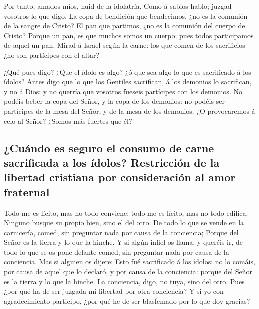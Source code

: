  Por tanto, amados míos, huid de la idolatría.
 Como á sabios hablo; juzgad vosotros lo que digo.
 La copa de bendición que bendecimos, ¿no es la comunión de
la sangre de Cristo? El pan que partimos, ¿no es la comunión del cuerpo
de Cristo?  Porque un pan, es que muchos somos un cuerpo;
pues todos participamos de aquel un pan.  Mirad á Israel
según la carne: los que comen de los sacrificios ¿no son partícipes con
el altar?

 ¿Qué pues digo? ¿Que el ídolo es algo? ¿ó que sea algo lo
que es sacrificado á los ídolos?  Antes digo que lo que los
Gentiles sacrifican, á los demonios lo sacrifican, y no á Dios: y no
querría que vosotros fueseis partícipes con los demonios. 
No podéis beber la copa del Señor, y la copa de los demonios: no podéis
ser partícipes de la mesa del Señor, y de la mesa de los demonios.
 ¿O provocaremos á celo al Señor? ¿Somos más fuertes que
él?

\hypertarget{cuuxe1ndo-es-seguro-el-consumo-de-carne-sacrificada-a-los-uxeddolos-restricciuxf3n-de-la-libertad-cristiana-por-consideraciuxf3n-al-amor-fraternal}{%
\subsection{¿Cuándo es seguro el consumo de carne sacrificada a los
ídolos? Restricción de la libertad cristiana por consideración al amor
fraternal}\label{cuuxe1ndo-es-seguro-el-consumo-de-carne-sacrificada-a-los-uxeddolos-restricciuxf3n-de-la-libertad-cristiana-por-consideraciuxf3n-al-amor-fraternal}}

 Todo me es lícito, mas no todo conviene: todo me es
lícito, mas no todo edifica.  Ninguno busque su propio
bien, sino el del otro.  De todo lo que se vende en la
carnicería, comed, sin preguntar nada por causa de la conciencia;
 Porque del Señor es la tierra y lo que la hinche.
 Y si algún infiel os llama, y queréis ir, de todo lo que
se os pone delante comed, sin preguntar nada por causa de la conciencia.
 Mas si alguien os dijere: Esto fué sacrificado á los
ídolos: no lo comáis, por causa de aquel que lo declaró, y por causa de
la conciencia: porque del Señor es la tierra y lo que la hinche.
 La conciencia, digo, no tuya, sino del otro. Pues ¿por qué
ha de ser juzgada mi libertad por otra conciencia?  Y si yo
con agradecimiento participo, ¿por qué he de ser blasfemado por lo que
doy gracias?

